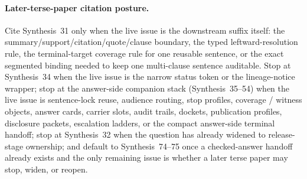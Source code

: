 \documentclass[11pt]{article}
\begin{document}
\paragraph{Later-terse-paper citation posture.}
Cite Synthesis~31 only when the live issue is the downstream suffix itself: the summary/support/citation/quote/clause boundary, the typed leftward-resolution rule, the terminal-target coverage rule for one reusable sentence, or the exact segmented binding needed to keep one multi-clause sentence auditable. Stop at Synthesis~34 when the live issue is the narrow status token or the lineage-notice wrapper; stop at the answer-side companion stack (Synthesis~35--54) when the live issue is sentence-lock reuse, audience routing, stop profiles, coverage / witness objects, answer cards, carrier slots, audit trails, dockets, publication profiles, disclosure packets, escalation ladders, or the compact answer-side terminal handoff; stop at Synthesis~32 when the question has already widened to release-stage ownership; and default to Synthesis~74--75 once a checked-answer handoff already exists and the only remaining issue is whether a later terse paper may stop, widen, or reopen.\cite{series:statusenvelopes,series:sentencelocks,series:challengeroutes,series:challengestops,series:challengeanswerreviewmenus,series:releasespine,series:pairedterminalcitationdiscipline,series:pairedterminalcutoverrules}
\end{document}

